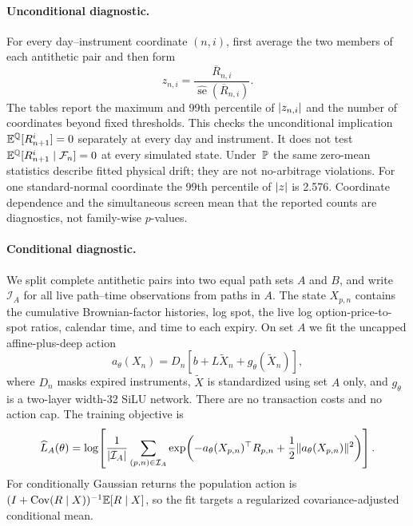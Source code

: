 {\paragraph{Unconditional diagnostic.}
For every day--instrument coordinate $(n,i)$, first average the two members of
each antithetic pair and then form
\begin{equation}\label{eq:numerics-z-score}
  z_{n,i}
  =\frac{\overline R_{n,i}}
  {\widehat{\operatorname{se}}(\overline R_{n,i})}.
\end{equation}
The tables report the maximum and 99th percentile of $\lvert z_{n,i}\rvert$ and the
number of coordinates beyond fixed thresholds.  This checks the unconditional
implication $\mathbb E^\mathbb Q[R_{n+1}^i]=0$ separately at every day and instrument.  It
does not test $\mathbb E^\mathbb Q[R_{n+1}^i\mid\mathcal F_n]=0$ at every simulated state.
Under~$\mathbb P$ the same zero-mean statistics describe fitted physical drift; they
are not no-arbitrage violations.  For one standard-normal coordinate the 99th
percentile of $\lvert z\rvert$ is 2.576.  Coordinate dependence and the simultaneous
screen mean that the reported counts are diagnostics, not family-wise
$p$-values.

\paragraph{Conditional diagnostic.}
We split complete antithetic pairs into two equal path sets $A$ and $B$, and
write $\mathcal I_A$ for all live path--time observations from paths in $A$.  The
state $X_{p,n}$ contains the cumulative Brownian-factor histories, log spot,
the live log option-price-to-spot ratios, calendar time, and time to each
expiry.  On set $A$ we fit the uncapped affine-plus-deep action
\begin{equation}\label{eq:numerics-action-map}
  a_\theta(X_n)
  =D_n\left[b+L\widetilde X_n+g_\theta(\widetilde X_n)\right],
\end{equation}
where $D_n$ masks expired instruments, $\widetilde X$ is standardized using
set $A$ only, and $g_\theta$ is a two-layer width-32 SiLU network.  There are no
transaction costs and no action cap.  The training objective is
\begin{equation}\label{eq:numerics-conditional-objective}
  \widehat L_A(\theta)
  =\log\!\left[
    \frac{1}{\lvert \mathcal I_A\rvert}
    \sum_{(p,n)\in\mathcal I_A}
    \exp\!\left(
      -a_\theta(X_{p,n})^\top R_{p,n}
      +\frac12\lVert a_\theta(X_{p,n})\rVert^2
    \right)
  \right].
\end{equation}
For conditionally Gaussian returns the population action is
$(I+\operatorname{Cov}(R\mid X))^{-1}\mathbb E[R\mid X]$, so the fit targets a
regularized covariance-adjusted conditional mean.

}
